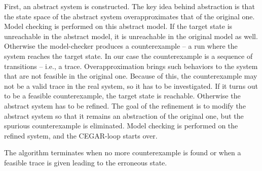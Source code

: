 First, an abstract system is constructed. The key idea behind abstraction is
that the state space of the abstract system overapproximates that of the original
one. 
Model checking is performed on this abstract model. If the target state is
unreachable in the abstract model, it is unreachable in the original model
as well. Otherwise the model-checker produces a counterexample -- a run where the
system reaches the target state. In our case the counterexample is a sequence of
transitions -- i.e., a trace. Overapproximation brings such behaviors to the system that are not feasible in the original one. Because of this, the counterexample may not be a valid trace in the real system, so it has to be investigated.
If it turns
out to be a feasible counterexample, the target state is reachable. Otherwise
the abstract system has to be refined. The goal of the refinement is to modify the abstract
system so that it remains an abstraction of the original one, but the spurious
counterexample is eliminated.  Model checking is performed on the
refined system, and the CEGAR-loop starts over. 

The algorithm terminates when no more
counterexample is found or when a feasible trace is
given leading to the erroneous state.